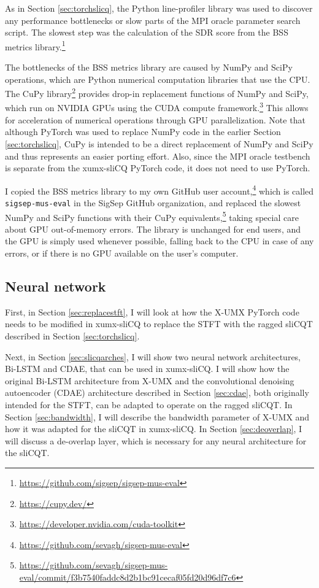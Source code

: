 \documentclass[report.tex]{subfiles}
\begin{document}
As in Section \ref{sec:torchslicq}, the Python line-profiler library was used to discover any performance bottlenecks or slow parts of the MPI oracle parameter search script. The slowest step was the calculation of the SDR score from the BSS metrics library.\footnote{\url{https://github.com/sigsep/sigsep-mus-eval}}

The bottlenecks of the BSS metrics library are caused by NumPy and SciPy operations, which are Python numerical computation libraries that use the CPU. The CuPy library\footnote{\url{https://cupy.dev/}} provides drop-in replacement functions of NumPy and SciPy, which run on NVIDIA GPUs using the CUDA compute framework.\footnote{\url{https://developer.nvidia.com/cuda-toolkit}} This allows for acceleration of numerical operations through GPU parallelization. Note that although PyTorch was used to replace NumPy code in the earlier Section \ref{sec:torchslicq}, CuPy is intended to be a direct replacement of NumPy and SciPy and thus represents an easier porting effort. Also, since the MPI oracle testbench is separate from the xumx-sliCQ PyTorch code, it does not need to use PyTorch.

I copied the BSS metrics library to my own GitHub user account,\footnote{\url{https://github.com/sevagh/sigsep-mus-eval}} which is called \Verb#sigsep-mus-eval# in the SigSep GitHub organization, and replaced the slowest NumPy and SciPy functions with their CuPy equivalents,\footnote{\url{https://github.com/sevagh/sigsep-mus-eval/commit/f3b7540faddc8d2b1bc91cecaf05fd20d96df7c6}} taking special care about GPU out-of-memory errors. The library is unchanged for end users, and the GPU is simply used whenever possible, falling back to the CPU in case of any errors, or if there is no GPU available on the user's computer.

\newpagefill

\subsection{Neural network}
\label{sec:neuralnet}

First, in Section \ref{sec:replacestft}, I will look at how the X-UMX PyTorch code needs to be modified in xumx-sliCQ to replace the STFT with the ragged sliCQT described in Section \ref{sec:torchslicq}.

Next, in Section \ref{sec:slicqarches}, I will show two neural network architectures, Bi-LSTM and CDAE, that can be used in xumx-sliCQ. I will show how the original Bi-LSTM architecture from X-UMX and the convolutional denoising autoencoder (CDAE) architecture described in Section \ref{sec:cdae}, both originally intended for the STFT, can be adapted to operate on the ragged sliCQT. In Section \ref{sec:bandwidth}, I will describe the bandwidth parameter of X-UMX and how it was adapted for the sliCQT in xumx-sliCQ. In Section \ref{sec:deoverlap}, I will discuss a de-overlap layer, which is necessary for any neural architecture for the sliCQT.
\end{document}
